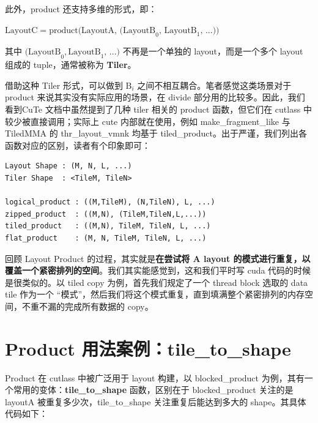 此外，product 还支持多维的形式，即：

$\text{LayoutC} = \text{product(LayoutA, (LayoutB}_0\text{, LayoutB}_1\text{, ...))}$

其中 $ \text{(LayoutB}_0,  \text{LayoutB}_1 \text{, ...)}$ 不再是一个单独的 layout，而是一个多个 layout 组成的 tuple，通常被称为 \textbf{Tiler}。

借助这种 Tiler 形式，可以做到 $\text{B}_i$ 之间不相互耦合。笔者感觉这类场景对于 product 来说其实没有实际应用的场景，在 divide 部分用的比较多。因此，我们看到CuTe 文档中虽然提到了几种 tiler 相关的 product 函数，但它们在 cutlass 中较少被直接调用；实际上 cute 内部就在使用，例如 make\_fragment\_like 与 TiledMMA 的 thr\_layout\_vmnk 均基于 tiled\_product。出于严谨，我们列出各函数对应的区别，读者有个印象即可：

\begin{lstlisting}
Layout Shape : (M, N, L, ...)
Tiler Shape  : <TileM, TileN>

logical_product : ((M,TileM), (N,TileN), L, ...)
zipped_product  : ((M,N), (TileM,TileN,L,...))
tiled_product   : ((M,N), TileM, TileN, L, ...)
flat_product    : (M, N, TileM, TileN, L, ...)
\end{lstlisting}

回顾 Layout Product 的过程，其实就是\textbf{在尝试将 A layout 的模式进行重复，以覆盖一个紧密排列的空间}。我们其实能感觉到，这和我们平时写 cuda 代码的时候是很类似的。以 tiled copy 为例，首先我们规定了一个 thread block 选取的 data tile 作为一个 “模式”，然后我们将这个模式重复，直到填满整个紧密排列的内存空间，不重不漏的完成所有数据的 copy。

\section{Product 用法案例：tile\_to\_shape}

Product 在 cutlass 中被广泛用于 layout 构建，以 blocked\_product 为例，其有一个常用的变体：\textbf{tile\_to\_shape} 函数，区别在于 blocked\_product 关注的是 layoutA 被重复多少次，tile\_to\_shape 关注重复后能达到多大的 shape。其具体代码如下：

